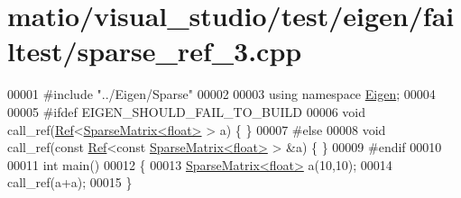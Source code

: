 \hypertarget{matio_2visual__studio_2test_2eigen_2failtest_2sparse__ref__3_8cpp_source}{}\section{matio/visual\+\_\+studio/test/eigen/failtest/sparse\+\_\+ref\+\_\+3.cpp}
\label{matio_2visual__studio_2test_2eigen_2failtest_2sparse__ref__3_8cpp_source}

\begin{DoxyCode}
00001 \textcolor{preprocessor}{#include "../Eigen/Sparse"}
00002 
00003 \textcolor{keyword}{using namespace }\hyperlink{namespace_eigen}{Eigen};
00004 
00005 \textcolor{preprocessor}{#ifdef EIGEN\_SHOULD\_FAIL\_TO\_BUILD}
00006 \textcolor{keywordtype}{void} call\_ref(\hyperlink{group___core___module_class_eigen_1_1_ref}{Ref}<\hyperlink{group___sparse_core___module_class_eigen_1_1_sparse_matrix}{SparseMatrix<float>} > a) \{ \}
00007 \textcolor{preprocessor}{#else}
00008 \textcolor{keywordtype}{void} call\_ref(\textcolor{keyword}{const} \hyperlink{group___core___module_class_eigen_1_1_ref}{Ref}<\textcolor{keyword}{const} \hyperlink{group___sparse_core___module_class_eigen_1_1_sparse_matrix}{SparseMatrix<float>} > &a) \{ \}
00009 \textcolor{preprocessor}{#endif}
00010 
00011 \textcolor{keywordtype}{int} main()
00012 \{
00013   \hyperlink{group___sparse_core___module_class_eigen_1_1_sparse_matrix}{SparseMatrix<float>} a(10,10);
00014   call\_ref(a+a);
00015 \}
\end{DoxyCode}

